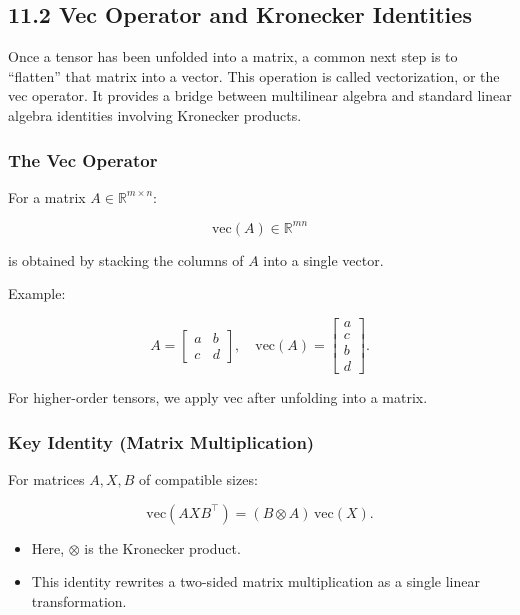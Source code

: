 \documentclass[
  letterpaper,
  DIV=11,
  numbers=noendperiod]{scrreprt}
\providecommand{\tightlist}{%
  \setlength{\itemsep}{0pt}\setlength{\parskip}{0pt}}
\begin{document}
\subsection{11.2 Vec Operator and Kronecker
Identities}\label{vec-operator-and-kronecker-identities}

Once a tensor has been unfolded into a matrix, a common next step is to
``flatten'' that matrix into a vector. This operation is called
vectorization, or the vec operator. It provides a bridge between
multilinear algebra and standard linear algebra identities involving
Kronecker products.

\subsubsection{The Vec Operator}\label{the-vec-operator}

For a matrix \(A \in \mathbb{R}^{m \times n}\):

\[
\mathrm{vec}(A) \in \mathbb{R}^{mn}
\]

is obtained by stacking the columns of \(A\) into a single vector.

Example:

\[
A = \begin{bmatrix} a & b \\ c & d \end{bmatrix}, \quad
\mathrm{vec}(A) = \begin{bmatrix} a \\ c \\ b \\ d \end{bmatrix}.
\]

For higher-order tensors, we apply vec after unfolding into a matrix.

\subsubsection{Key Identity (Matrix
Multiplication)}\label{key-identity-matrix-multiplication}

For matrices \(A, X, B\) of compatible sizes:

\[
\mathrm{vec}(AXB^\top) = (B \otimes A)\, \mathrm{vec}(X).
\]

\begin{itemize}
\tightlist
\item
  Here, \(\otimes\) is the Kronecker product.
\item
  This identity rewrites a two-sided matrix multiplication as a single
  linear transformation.
\end{itemize}
\end{document}
